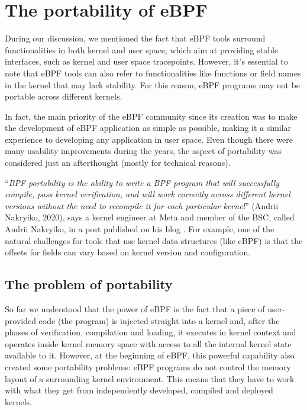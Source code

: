 \section{The portability of eBPF}

During our discussion, we mentioned the fact that eBPF tools surround functionalities in both kernel and user space, which aim at providing stable interfaces, such as kernel and user space tracepoints. 
However, it's essential to note that eBPF tools can also refer to functionalities like functions or field names in the kernel that may lack stability. 
For this reason, eBPF programs may not be portable across different kernels.

In fact, the main priority of the eBPF community since its creation was to make the development of eBPF application as simple as possible, making it a similar experience to developing any application in user space.
Even though there were many usability improvements during the years, the aspect of portability was considered just an afterthought (mostly for technical reasons).

``\textit{BPF portability is the ability to write a BPF program that will successfully compile, pass kernel verification, and will work correctly across different kernel versions without the need to recompile it for each particular kernel}'' (Andrii Nakryiko, 2020), says a kernel engineer at Meta and member of the BSC, called Andrii Nakryiko, in a post \cite{ANCOREPost} published on his blog \cite{ANBlog}.
For example, one of the natural challenges for tools that use kernel data structures (like eBPF) is that the offsets for fields can vary based on kernel version and configuration.

\subsection{The problem of portability}

So far we understood that the power of eBPF is the fact that a piece of user-provided code (the program) is injected straight into a kernel and, after the phases of verification, compilation and loading, it executes in kernel context and operates inside kernel memory space with access to all the internal kernel state available to it. 
However, at the beginning of eBPF, this powerful capability also created some portability problems: eBPF programs do not control the memory layout of a surrounding kernel environment. 
This means that they have to work with what they get from independently developed, compiled and deployed kernels.

